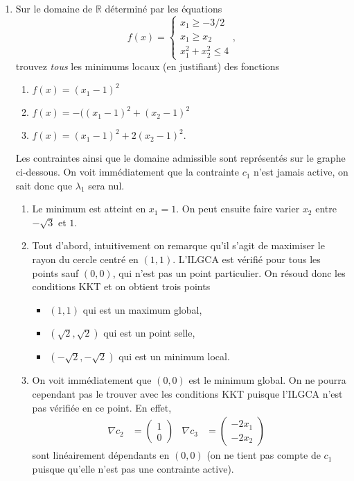 \begin{enumerate}
\begin{solution}
  \end{solution}
    
  \item Sur le domaine de $\mathbb{R}$ déterminé par les équations
  \[f(x) = \left\{ \begin{array}{rcl}
           x_1 \geq -3/2 \\ 
           x_1 \geq x_2 \\
           x_1^2 + x_2^2 \leq 4 
            \end{array}\right.,
  \]
  trouvez \emph{tous} les minimums locaux (en justifiant) des fonctions
  \begin{enumerate}
    \item $f(x) = (x_1 - 1)^2$
    \item $f(x) = -((x_1 - 1)^2 + (x_2 - 1)^2$
    \item $f(x) = (x_1 - 1)^2 + 2(x_2 - 1)^2.$
  \end{enumerate}
  
  \begin{solution}
    Les contraintes ainsi que le domaine admissible sont représentés
    sur le graphe ci-dessous.
    On voit immédiatement que la contrainte $c_1$ n'est jamais active,
    on sait donc que $\lambda_1$ sera nul.
    \begin{enumerate}
      \item Le minimum est atteint en $x_1 = 1$.
      On peut ensuite faire varier $x_2$ entre $-\sqrt{3}$ et $1$.
      
      \item Tout d'abord, intuitivement on remarque qu'il s'agit de
      maximiser le rayon du cercle centré en $(1,1)$.
      L'ILGCA est vérifié pour tous les points sauf $(0,0)$,
      qui n'est pas un point particulier.
      On résoud donc les conditions KKT et on obtient trois points
      \begin{itemize}
        \item $(1,1)$ qui est un maximum global,
        \item $(\sqrt{2},\sqrt{2})$ qui est un point selle,
        \item $(-\sqrt{2},-\sqrt{2})$ qui est un minimum local.
      \end{itemize}
      
      \item On voit immédiatement que $(0,0)$ est le minimum global.
      On ne pourra cependant pas le trouver avec les conditions KKT
      puisque l'ILGCA n'est pas vérifiée en ce point.
      En effet,
      \begin{align*}
        \nabla c_2 &= \begin{pmatrix} 1 \\ 0 \end{pmatrix} &
        \nabla c_3 &= \begin{pmatrix} -2x_1 \\ -2x_2 \end{pmatrix} &
      \end{align*}
      sont linéairement dépendants en $(0,0)$ (on ne tient pas compte de $c_1$ 
      puisque qu'elle n'est pas une contrainte active).
    \end{enumerate}    
    

\end{solution}
\end{enumerate}
